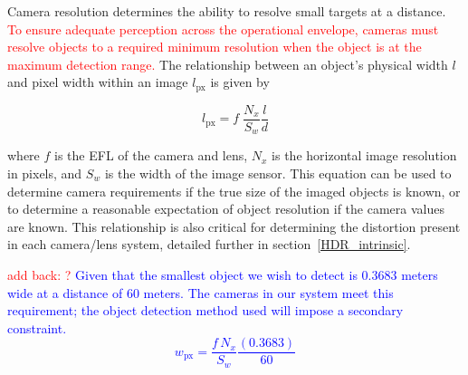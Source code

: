 \documentclass{erauthesis}
\begin{document}
Camera resolution determines the ability to resolve small targets at a distance.
\textcolor{red}{To ensure adequate perception across the operational envelope, cameras must resolve objects to a required minimum resolution when the object is at the maximum detection range.}
The relationship between an object's physical width $\mathit{l}$ and pixel width within an image $\mathit{l}_{\text{px}}$ is given by

\begin{equation}
\mathit{l}_{\text{px}} = f \; \frac{N_x}{S_w}\frac{\mathit{l}}{d}
\end{equation}

where $f$ is the \ac{EFL} of the camera and lens, $N_x$ is the horizontal image resolution in pixels, and $S_w$ is the width of the image sensor.
This equation can be used to determine camera requirements if the true size of the imaged objects is known, or to determine a reasonable expectation of object resolution if the camera values are known.
This relationship is also critical for determining the distortion present in each camera/lens system, detailed further in section~\ref{HDR_intrinsic}.

\textcolor{red}{add back: ?}
\textcolor{blue}{
Given that the smallest object we wish to detect is $0.3683$ meters wide at a distance of 60 meters.
The cameras in our system meet this requirement; the object detection method used will impose a secondary constraint.
  \begin{equation}
  w_{\text{px}} = \frac{f \, N_x}{S_w}\frac{(0.3683)}{60}
  \end{equation}
  }
\end{document}
